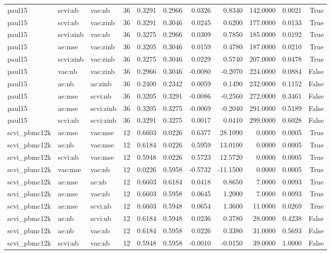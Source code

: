 \begin{tabular}{lllrrrrrrrr}
paul15 & scvi:nb & vae:nb & 36 & 0.3291 & 0.2966 & 0.0326 & 0.8340 & 142.0000 & 0.0021 & True \\
paul15 & scvi:nb & vae:zinb & 36 & 0.3291 & 0.3046 & 0.0245 & 0.6200 & 177.0000 & 0.0133 & True \\
paul15 & scvi:zinb & vae:nb & 36 & 0.3275 & 0.2966 & 0.0309 & 0.7850 & 185.0000 & 0.0192 & True \\
paul15 & ae:mse & vae:zinb & 36 & 0.3205 & 0.3046 & 0.0159 & 0.4780 & 187.0000 & 0.0210 & True \\
paul15 & scvi:zinb & vae:zinb & 36 & 0.3275 & 0.3046 & 0.0229 & 0.5740 & 207.0000 & 0.0478 & True \\
paul15 & vae:nb & vae:zinb & 36 & 0.2966 & 0.3046 & -0.0080 & -0.2070 & 224.0000 & 0.0884 & False \\
paul15 & ae:nb & ae:zinb & 36 & 0.2400 & 0.2342 & 0.0059 & 0.1490 & 232.0000 & 0.1152 & False \\
paul15 & ae:mse & scvi:nb & 36 & 0.3205 & 0.3291 & -0.0086 & -0.2560 & 272.0000 & 0.3461 & False \\
paul15 & ae:mse & scvi:zinb & 36 & 0.3205 & 0.3275 & -0.0069 & -0.2040 & 291.0000 & 0.5189 & False \\
paul15 & scvi:nb & scvi:zinb & 36 & 0.3291 & 0.3275 & 0.0017 & 0.0410 & 299.0000 & 0.6028 & False \\
scvi\_pbmc12k & ae:mse & vae:mse & 12 & 0.6603 & 0.0226 & 0.6377 & 28.1090 & 0.0000 & 0.0005 & True \\
scvi\_pbmc12k & ae:nb & vae:mse & 12 & 0.6184 & 0.0226 & 0.5959 & 13.0100 & 0.0000 & 0.0005 & True \\
scvi\_pbmc12k & scvi:nb & vae:mse & 12 & 0.5948 & 0.0226 & 0.5723 & 12.5720 & 0.0000 & 0.0005 & True \\
scvi\_pbmc12k & vae:mse & vae:nb & 12 & 0.0226 & 0.5958 & -0.5732 & -11.1500 & 0.0000 & 0.0005 & True \\
scvi\_pbmc12k & ae:mse & ae:nb & 12 & 0.6603 & 0.6184 & 0.0418 & 0.8650 & 7.0000 & 0.0093 & True \\
scvi\_pbmc12k & ae:mse & vae:nb & 12 & 0.6603 & 0.5958 & 0.0645 & 1.2000 & 7.0000 & 0.0093 & True \\
scvi\_pbmc12k & ae:mse & scvi:nb & 12 & 0.6603 & 0.5948 & 0.0654 & 1.3600 & 11.0000 & 0.0269 & True \\
scvi\_pbmc12k & ae:nb & scvi:nb & 12 & 0.6184 & 0.5948 & 0.0236 & 0.3780 & 28.0000 & 0.4238 & False \\
scvi\_pbmc12k & ae:nb & vae:nb & 12 & 0.6184 & 0.5958 & 0.0226 & 0.3380 & 31.0000 & 0.5693 & False \\
scvi\_pbmc12k & scvi:nb & vae:nb & 12 & 0.5948 & 0.5958 & -0.0010 & -0.0150 & 39.0000 & 1.0000 & False \\
\bottomrule
\end{tabular}

